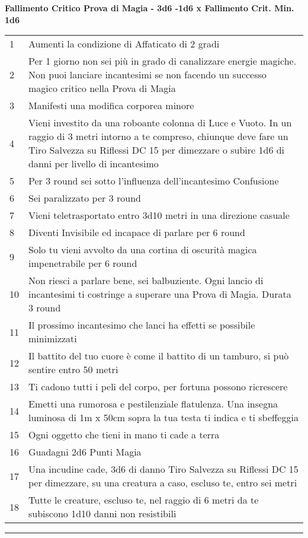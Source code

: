 \documentclass[a4paper,12 pt,openany]{book}
\newcommand{\riga}{\rule{\textwidth}{0.4pt}}
\begin{document}
\begin{textblock*}{13.5cm}
\textbf{Fallimento Critico Prova di Magia - 3d6 -1d6 x Fallimento Crit. Min. 1d6}
\begin{tabularx}{0.95\textwidth}{lX}
1 & Aumenti la condizione di Affaticato di 2 gradi\\
2 & Per 1 giorno non sei più in grado di canalizzare energie magiche. Non puoi lanciare incantesimi se non facendo un successo magico critico nella Prova di Magia\\
3 & Manifesti una modifica corporea minore\\
4 & Vieni investito da una roboante colonna di Luce e Vuoto. In un raggio di 3 metri intorno a te compreso, chiunque deve fare un Tiro Salvezza su Riflessi DC 15 per dimezzare o subire 1d6 di danni per livello di incantesimo\\
5 & Per 3 round sei sotto l'influenza dell'incantesimo Confusione\\
6 & Sei paralizzato per 3 round\\
7 & Vieni teletrasportato entro 3d10 metri in una direzione casuale\\
8 & Diventi Invisibile ed incapace di parlare per 6 round\\
9 &  Solo tu vieni avvolto da una cortina di oscurità magica impenetrabile per 6 round\\
10 & Non riesci a parlare bene, sei balbuziente. Ogni lancio di incantesimi ti costringe a superare una Prova di Magia. Durata 3 round\\
11 & Il prossimo incantesimo che lanci ha effetti se possibile minimizzati\\
12 & Il battito del tuo cuore è come il battito di un tamburo, si può sentire entro 50 metri\\
13 & Ti cadono tutti i peli del corpo, per fortuna possono ricrescere\\
14 & Emetti una rumorosa e pestilenziale flatulenza. Una insegna luminosa di 1m x 50cm sopra la tua testa ti indica e ti sbeffeggia\\
15 & Ogni oggetto che tieni in mano ti cade a terra\\
16 & Guadagni 2d6 Punti Magia\\
17 & Una incudine cade, 3d6 di danno Tiro Salvezza su Riflessi DC 15 per dimezzare, su una creatura a caso, escluso te, entro sei metri\\
18 & Tutte le creature, escluso te, nel raggio di 6 metri da te subiscono 1d10 danni non resistibili
\end{tabularx}

\riga


\end{textblock*}
\end{document}
